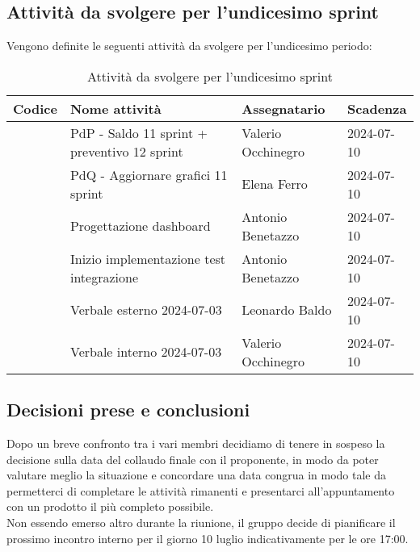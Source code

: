 \documentclass[italian,12pt]{article}
\begin{document}
\newpage
\subsection{Attività da svolgere per l'undicesimo sprint}
Vengono definite le seguenti attività da svolgere per l'undicesimo periodo:
\begin{table}[!h]
	\centering
	\begin{tabular}{ |l||p{7cm}|l|l| }
		\hline
		\textbf{Codice}    & \textbf{Nome attività}                           & \textbf{Assegnatario} & \textbf{Scadenza} \\
		\hline
		\mySkip[86bzjkp80] & PdP - Saldo 11 sprint + preventivo 12 sprint     & Valerio Occhinegro    & 2024-07-10        \\
		\mySkip[86bzjkpg8] & PdQ - Aggiornare grafici 11 sprint               & Elena Ferro           & 2024-07-10        \\
		\mySkip[86bz8dzz7] & Progettazione dashboard                          & Antonio Benetazzo     & 2024-07-10        \\
		\mySkip[86byzyxmz] & Inizio implementazione test integrazione         & Antonio Benetazzo     & 2024-07-10        \\
		\mySkip[86bzjkpx9] & Verbale esterno 2024-07-03                       & Leonardo Baldo        & 2024-07-10        \\
		\mySkip[86bzjkpy4] & Verbale interno 2024-07-03                       & Valerio Occhinegro    & 2024-07-10        \\
		\hline
	\end{tabular}
	\caption{Attività da svolgere per l'undicesimo sprint}
\end{table}

\subsection{Decisioni prese e conclusioni}
Dopo un breve confronto tra i vari membri decidiamo di tenere in sospeso la decisione sulla data del collaudo finale con il proponente, in modo da poter valutare meglio la situazione e concordare una data congrua in modo tale da permetterci di completare le attività rimanenti e presentarci all'appuntamento con un prodotto il più completo possibile. \\
Non essendo emerso altro durante la riunione, il gruppo decide di pianificare il prossimo incontro interno per il giorno 10 luglio indicativamente per le ore 17:00.
\end{document}
